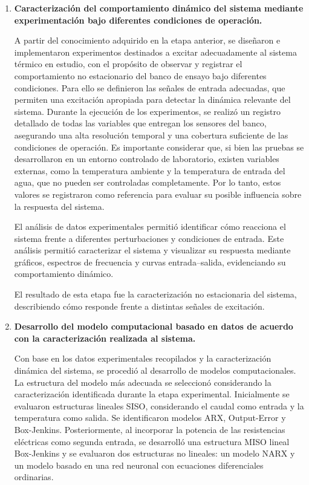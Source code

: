 \documentclass[11pt]{report}
\begin{document}
\begin{enumerate}
\item \textbf{Caracterización del comportamiento dinámico del sistema mediante experimentación bajo diferentes condiciones de operación.}

A partir del conocimiento adquirido en la etapa anterior, se diseñaron e implementaron experimentos destinados a excitar adecuadamente al sistema térmico en estudio, con el propósito de observar y registrar el comportamiento no estacionario del banco de ensayo bajo diferentes condiciones.
Para ello se definieron las señales de entrada adecuadas, que permiten una excitación apropiada para detectar la dinámica relevante del sistema. Durante la ejecución de los experimentos, se realizó un registro detallado de todas las variables que entregan los sensores del banco, asegurando una alta resolución temporal y una cobertura suficiente de las condiciones de operación.
Es importante considerar que, si bien las pruebas se desarrollaron en un entorno controlado de laboratorio, existen variables externas, como la temperatura ambiente y la temperatura de entrada del agua, que no pueden ser controladas completamente. Por lo tanto, estos valores se registraron como referencia para evaluar su posible influencia sobre la respuesta del sistema.

El análisis de datos experimentales permitió identificar cómo reacciona el sistema frente a diferentes perturbaciones y condiciones de entrada. Este análisis permitió caracterizar el sistema y visualizar su respuesta mediante gráficos, espectros de frecuencia y curvas entrada–salida, evidenciando su comportamiento dinámico.

El resultado de esta etapa fue la caracterización no estacionaria del sistema, describiendo cómo responde frente a distintas señales de excitación. 



\item \textbf{Desarrollo del modelo computacional basado en datos de acuerdo con la caracterización realizada al sistema.}

Con base en los datos experimentales recopilados y la caracterización dinámica del sistema, se procedió al desarrollo de modelos computacionales. La estructura del modelo más adecuada se seleccionó considerando la caracterización identificada durante la etapa experimental.
Inicialmente se evaluaron estructuras lineales SISO, considerando el caudal como entrada y la temperatura como salida. Se identificaron modelos ARX, Output-Error y Box-Jenkins. Posteriormente, al incorporar la potencia de las resistencias eléctricas como segunda entrada, se desarrolló una estructura MISO lineal Box-Jenkins y se evaluaron dos estructuras no lineales: un modelo NARX y un modelo basado en una red neuronal con ecuaciones diferenciales ordinarias.


\end{enumerate}
\end{document}
